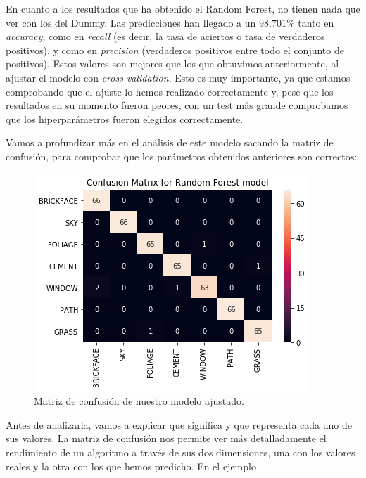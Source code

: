 \documentclass[11pt,a4paper]{article}
\begin{document}
En cuanto a los resultados que ha obtenido el Random Forest, no tienen nada que ver con los del Dummy. Las predicciones han llegado a un $98.701\%$ tanto en \textit{accuracy}, como en \textit{recall} (es decir, la tasa de aciertos o tasa de verdaderos positivos), y como en \textit{precision} (verdaderos positivos entre todo el conjunto de positivos). Estos valores son mejores que los que obtuvimos anteriormente, al ajustar el modelo con \textit{cross-validation}. Esto es muy importante, ya que estamos comprobando que el ajuste lo hemos realizado correctamente y, pese que los resultados en su momento fueron peores, con un test más grande comprobamos que los hiperparámetros fueron elegidos correctamente.

Vamos a profundizar más en el análisis de este modelo sacando la matriz de confusión, para comprobar que los parámetros obtenidos anteriores son correctos:

\begin{figure}[H]
    \centering
    \includegraphics[scale=0.7]{img/confusion-matrix.png}
    \caption{Matriz de confusión de nuestro modelo ajustado.}
    \label{fig:confusion-matrix}
\end{figure}

Antes de analizarla, vamos a explicar que significa y que representa cada uno de sus valores. La matriz de confusión nos permite ver más detalladamente el rendimiento de un algoritmo a través de sus dos dimensiones, una con los valores reales y la otra con los que hemos predicho. En el ejemplo 

\newpage
\end{document}
